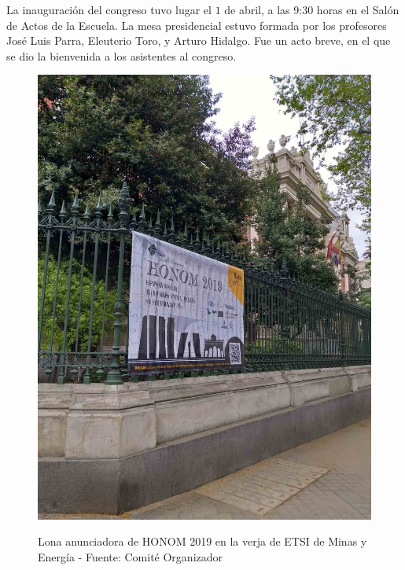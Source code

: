 \documentclass[twoside]{article}
\begin{document}
La inauguración del congreso tuvo lugar el $1$ de abril, a las 9:30 horas en el Salón de Actos de la Escuela. La mesa presidencial estuvo formada por los profesores José Luis Parra, Eleuterio Toro, y Arturo Hidalgo. Fue un acto breve, en el que se dio la bienvenida a los asistentes al congreso.
%
\begin{center}
\begin{figure}
	\centering
		\includegraphics[width=.75\textwidth]{Lona}
	\label{fig:LonaVerja}
	\caption{Lona anunciadora de HONOM 2019 en la verja de ETSI de Minas y Energía  - Fuente: Comité Organizador}
\end{figure}
\end{center}
%
\end{document}
